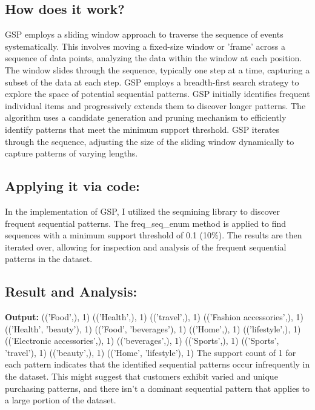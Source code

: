 \subsection{How does it work?}
GSP employs a sliding window approach to traverse the sequence of events systematically. This involves moving a fixed-size window or 'frame' across a sequence of data points, analyzing the data within the window at each position. The window slides through the sequence, typically one step at a time, capturing a subset of the data at each step.
\newline 
GSP employs a breadth-first search strategy to explore the space of potential sequential patterns. GSP initially identifies frequent individual items and progressively extends them to discover longer patterns. The algorithm uses a candidate generation and pruning mechanism to efficiently identify patterns that meet the minimum support threshold. GSP iterates through the sequence, adjusting the size of the sliding window dynamically to capture patterns of varying lengths.

\subsection{Applying it via code:}
In the implementation of GSP, I utilized the seqmining library to discover frequent sequential patterns. The freq_seq_enum method is applied to find sequences with a minimum support threshold of 0.1 (10\%). The results are then iterated over, allowing for inspection and analysis of the frequent sequential patterns in the dataset.

\subsection{Result and Analysis:}
\textbf{Output:}
\newline
(('Food',), 1)
\newline
(('Health',), 1)
\newline
(('travel',), 1)
\newline
(('Fashion accessories',), 1)
\newline
(('Health', 'beauty'), 1)
\newline
(('Food', 'beverages'), 1)
\newline
(('Home',), 1)
\newline
(('lifestyle',), 1)
\newline
(('Electronic accessories',), 1)
\newline
(('beverages',), 1)
\newline
(('Sports',), 1)
\newline
(('Sports', 'travel'), 1)
\newline
(('beauty',), 1)
\newline
(('Home', 'lifestyle'), 1)
\newline 
\newline 
The support count of 1 for each pattern indicates that the identified sequential patterns occur infrequently in the dataset. This might suggest that customers exhibit varied and unique purchasing patterns, and there isn't a dominant sequential pattern that applies to a large portion of the dataset.


